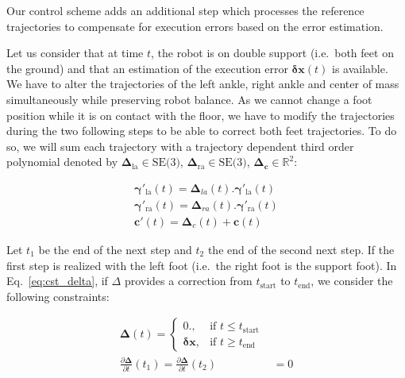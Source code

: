 Our control scheme adds an additional step which processes the
reference trajectories to compensate for execution errors based on the
error estimation.

Let us consider that at time $t$, the robot is on double support
(i.e.\ both feet on the ground) and that an estimation of the
execution error $\mathbf{\delta \mathbf{x}}(t)$ is available. We have
to alter the trajectories of the left ankle, right ankle and center of
mass simultaneously while preserving robot balance. As we cannot
change a foot position while it is on contact with the floor, we have
to modify the trajectories during the two following steps to be able
to correct both feet trajectories. To do so, we will sum each
trajectory with a trajectory dependent third order polynomial denoted
by $\mathbf{\Delta}_{\text{la}} \in \text{SE(3)}$,
$\mathbf{\Delta}_{\text{ra}} \in \text{SE(3)}$,
$\mathbf{\Delta}_{\mathbf{c}} \in \mathbb{R}^2$:

\begin{equation}
  \begin{aligned}
    \mathbf{\gamma}'_{\text{la}}(t) = \mathbf{\Delta}_{la}(t) . \mathbf{\gamma}'_{\text{la}}(t)\\
    \mathbf{\gamma}'_{\text{ra}}(t) = \mathbf{\Delta}_{ra}(t) . \mathbf{\gamma}'_{\text{ra}}(t)\\
    \mathbf{c}'(t) = \mathbf{\Delta}_{c}(t) + \mathbf{c}(t)
  \end{aligned}
  \label{eq:cst_delta}
\end{equation}

Let $t_1$ be the end of the next step and $t_2$ the end of the second
next step. If the first step is realized with the left foot (i.e.\ the
right foot is the support foot). In Eq.~\ref{eq:cst_delta}, if
$\Delta$ provides a correction from $t_{\text{start}}$ to
$t_{\text{end}}$, we consider the following constraints:

\begin{equation}
\begin{aligned}
  \mathbf{\Delta}(t) =
  \begin{cases}
    0.,  & \mbox{if }t\mbox{$\leq t_{\text{start}}$} \\
    \mathbf{\delta x}, & \mbox{if }t\mbox{$\geq t_{\text{end}}$}
  \end{cases}\\
  \frac{\partial \mathbf{\Delta}}{\partial t}(t_1) = \frac{\partial
    \mathbf{\Delta}}{\partial t}(t_2) &= 0
\end{aligned}
\label{eq:deltaConstraints}
\end{equation}

